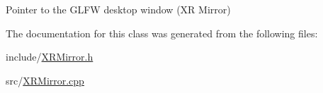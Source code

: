 Pointer to the G\+L\+FW desktop window (XR Mirror) 



The documentation for this class was generated from the following files\+:\begin{DoxyCompactItemize}
\item 
include/\mbox{\hyperlink{_x_r_mirror_8h}{X\+R\+Mirror.\+h}}\item 
src/\mbox{\hyperlink{_x_r_mirror_8cpp}{X\+R\+Mirror.\+cpp}}\end{DoxyCompactItemize}
